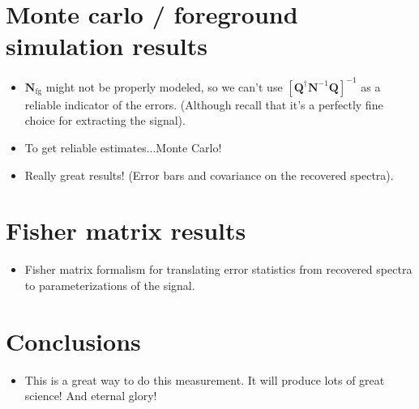 \documentclass[twolcolumn,apj]{emulateapj}
\begin{document}
\section{Monte carlo / foreground simulation results}
\begin{itemize}
\item $\mathbf{N}_\textrm{fg}$ might not be properly modeled, so we can't use $[\mathbf{Q}^\dagger \mathbf{N}^{-1} \mathbf{Q}]^{-1}$ as a reliable indicator of the errors.  (Although recall that it's a perfectly fine choice for extracting the signal).
\item To get reliable estimates...Monte Carlo!
\item Really great results! (Error bars and covariance on the recovered spectra).
\end{itemize}

\section{Fisher matrix results}
\begin{itemize}
\item Fisher matrix formalism for translating error statistics from recovered spectra to parameterizations of the signal.
\end{itemize}

\section{Conclusions}
\begin{itemize}
\item This is a great way to do this measurement.  It will produce lots of great science! And eternal glory!
\end{itemize}


{}
\end{document}
